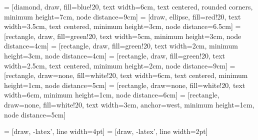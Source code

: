 \documentclass[12pt, landscape]{article}
\begin{document}

 = [diamond, draw, fill=blue!20, 
    text width=6cm, text centered, rounded corners, minimum height=7cm, node distance=9cm]
 = [draw, ellipse, fill=red!20, 
	text width=3.5cm, text centered, minimum height=3cm, node distance=6.5cm]
 = [rectangle, draw, fill=green!20, 
    text width=5cm,  minimum height=3cm, node distance=4cm]
 = [rectangle, draw, fill=green!20, 
    text width=2cm,  minimum height=3cm, node distance=4cm]
 = [rectangle, draw, fill=green!20, 
    text width=2.5cm, text centered, minimum height=2cm, node distance=9cm]
 = [rectangle, draw=none, fill=white!20, 
    text width=6cm, text centered, minimum height=1cm, node distance=5cm]
 = [rectangle, draw=none, fill=white!20, 
    text width=6cm, minimum height=1cm, node distance=6cm]
 = [rectangle, draw=none, fill=white!20, 
    text width=3cm, anchor=west, minimum height=1cm, node distance=5cm]    

 = [draw, -latex', line width=4pt]
 = [draw, -latex', line width=2pt]
\end{document}
